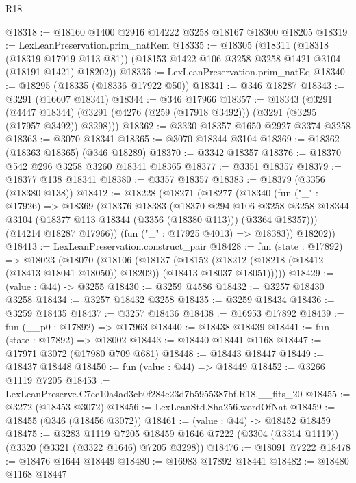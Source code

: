 \begin{lexlean}{R18}
\begin{coremodule}
@18318 := @18160 @1400 @2916 @14222 @3258 @18167 @18300 @18205
@18319 := LexLeanPreservation.prim_natRem
@18335 := @18305
    (@18311
      (@18318 (@18319 @17919 @113 @81))
      (@18153 @1422 @106 @3258 @3258 @1421 @3104 (@18191 @1421) @18202))
@18336 := LexLeanPreservation.prim_natEq
@18340 := @18295 (@18335 (@18336 @17922 @50))
@18341 := @346 @18287
@18343 := @3291 (@16607 @18341)
@18344 := @346 @17966
@18357 := @18343
    (@3291
      (@4447 @18344)
      (@3291 (@4276 (@259 (@17918 @3492))) (@3291 (@3295 (@17957 @3492)) @3298)))
@18362 := @3330 @18357 @1650 @2927 @3374 @3258
@18363 := @3070 @18341
@18365 := @3070 @18344 @3104
@18369 := @18362 (@18363 @18365) (@346 @18289)
@18370 := @3342 @18357
@18376 := @18370 @542 @296 @3258 @3260 @18341 @18365
@18377 := @3351 @18357
@18379 := @18377 @138 @18341
@18380 := @3357 @18357
@18383 := @18379 (@3356 (@18380 @138))
@18412 := @18228
    (@18271
      (@18277
        (@18340
          (fun ("_" : @17926) =>
          @18369
            (@18376
              @18383
              (@18370
                @294
                @106
                @3258
                @3258
                @18344
                @3104
                (@18377 @113 @18344 (@3356 (@18380 @113)))
                (@3364 @18357)))
            (@14214 @18287 @17966))
          (fun ("_" : @17925 @4013) => @18383))
        @18202))
@18413 := LexLeanPreservation.construct_pair
@18428 := fun (state : @17892) =>
  @18023
    (@18070
      (@18106
        (@18137
          (@18152
            (@18212 (@18218 (@18412 (@18413 @18041 @18050)) @18202))
            (@18413 @18037 @18051)))))
@18429 := (value : @44) -> @3255
@18430 := @3259 @4586
@18432 := @3257 @18430 @3258
@18434 := @3257 @18432 @3258
@18435 := @3259 @18434
@18436 := @3259 @18435
@18437 := @3257 @18436
@18438 := @16953 @17892
@18439 := fun (__p0 : @17892) => @17963
@18440 := @18438 @18439
@18441 := fun (state : @17892) => @18002
@18443 := @18440 @18441 @1168
@18447 := @17971 @3072 (@17980 @709 @681)
@18448 := @18443 @18447
@18449 := @18437 @18448
@18450 := fun (value : @44) => @18449
@18452 := @3266 @1119 @7205
@18453 := LexLeanPreserve.C7ec10a4ad3cb0f284e23d7b5955387bf.R18.__fits_20
@18455 := @3272 (@18453 @3072)
@18456 := LexLeanStd.Sha256.wordOfNat
@18459 := @18455 (@346 (@18456 @3072))
@18461 := (value : @44) -> @18452 @18459
@18475 := @3283
    @1119
    @7205
    @18459
    @1646
    @7222
    (@3304 (@3314 @1119))
    (@3320 (@3321 (@3322 @1646) @7205 @3298))
@18476 := @18091 @7222
@18478 := @18476 @1644 @18449
@18480 := @16983 @17892 @18441
@18482 := @18480 @1168 @18447

\end{coremodule}
\end{lexlean}
